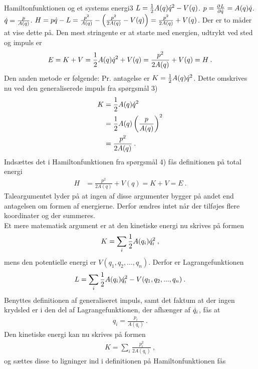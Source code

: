\begin{opgave}{Hamiltonfunktionen og et systems energi}{3}
\opg $L = \frac{1}{2}A(q)\dt{q}^2 - V(q)$.
\opg $p = \pdif{\dt{q}}{L} = A(q)\dt{q}$.
\opg $\dt{q} = \frac{p}{A(q)}$.
\opg $H = p\dt{q} - L = \frac{p^2}{A(q)} - \left( \frac{p^2}{2A(q)} - V(q)\right) = \frac{p^2}{2A(q)} + V(q)$.
\opg Der er to måder at vise dette på. Den mest stringente er at starte med energien, udtrykt ved sted og impuls er
\begin{align*}
	E = K + V = \frac{1}{2}A(q)\dt{q}^2 + V(q) = \frac{p^2}{2A(q)} + V(q) = H \: .
\end{align*}
Den anden metode er følgende: Pr. antagelse er $K = \frac{1}{2}A(q)\dt{q}^2$. Dette omskrives nu ved den generaliserede impuls fra spørgsmål 3)
\begin{align*}
	K &= \frac{1}{2}A(q)\dt{q}^2 \\
	&= \frac{1}{2}A(q)\left(\frac{p}{A(q)}\right)^2 \\
	&= \frac{p^2}{2A(q)} \: .
\end{align*}
Indsættes det i Hamiltonfunktionen fra spørgsmål 4) fås definitionen på total energi
\begin{align*}
	H &= \frac{p^2}{2A(q)} + V(q) = K + V = E \: .
\end{align*}
\opg Taleargumentet lyder på at ingen af disse argumenter bygger på andet end antagelsen om formen af energierne. Derfor ændres intet når der tilføjes flere koordinater og der summeres. \\
Et mere matematisk argument er at den kinetiske energi nu skrives på formen
\begin{align*}
	K = \sum_i\frac{1}{2}A(q_i)\dt{q}_i^2 \: ,
\end{align*}
mens den potentielle energi er $V(q_1,q_2,...,q_n)$. Derfor er Lagrangefunktionen
\begin{align*}
	L = \sum_i\frac{1}{2}A(q_i)\dt{q}_i^2 -  V(q_1,q_2,...,q_n) \: .
\end{align*}
Benyttes definitionen af generaliseret impuls, samt det faktum at der ingen krydsled er i den del af Lagrangefunktionen, der afhænger af $\dt{q
}_i$, fås at
\begin{align*}
	q_i = \frac{p_i}{A(q_i)} \: .
\end{align*}
Den kinetiske energi kan nu skrives på formen
\begin{align*}
	K = \sum_i\frac{p_i^2}{2A(q_i)} \: ,
\end{align*}
og sættes disse to ligninger ind i definitionen på Hamiltonfunktionen fås
\begin{align*}

\end{align*}
\end{opgave}
